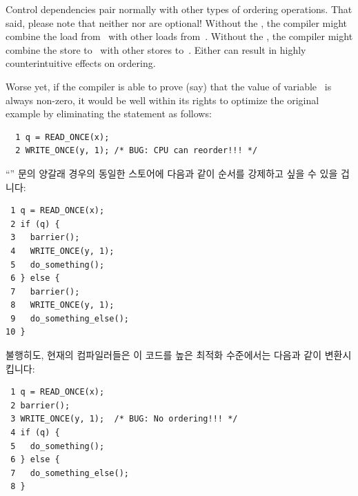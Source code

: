 Control dependencies pair normally with other types of ordering operations.
That said, please note that neither  nor 
are optional!
Without the , the compiler might combine the load
from~ with other loads from~.
Without the , the compiler might combine the store
to~ with other stores to~.
Either can result in highly counterintuitive effects on ordering.

Worse yet, if the compiler is able to prove (say) that the value of
variable~ is always non-zero, it would be well within its rights
to optimize the original example by eliminating the  statement
as follows:
\fi

\vspace{5pt}
\begin{minipage}[t]{\columnwidth}
\scriptsize
\begin{verbatim}
  1 q = READ_ONCE(x);
  2 WRITE_ONCE(y, 1); /* BUG: CPU can reorder!!! */
\end{verbatim}
\end{minipage}
\vspace{5pt}

``'' 문의 양갈래 경우의 동일한 스토어에 다음과 같이 순서를 강제하고 싶을
수 있을 겁니다:

\vspace{5pt}
\begin{minipage}[t]{\columnwidth}
\scriptsize
\begin{verbatim}
 1 q = READ_ONCE(x);
 2 if (q) {
 3   barrier();
 4   WRITE_ONCE(y, 1);
 5   do_something();
 6 } else {
 7   barrier();
 8   WRITE_ONCE(y, 1);
 9   do_something_else();
10 }
\end{verbatim}
\end{minipage}
\vspace{5pt}

불행히도, 현재의 컴파일러들은 이 코드를 높은 최적화 수준에서는 다음과 같이
변환시킵니다:

\vspace{5pt}
\begin{minipage}[t]{\columnwidth}
\scriptsize
\begin{verbatim}
 1 q = READ_ONCE(x);
 2 barrier();
 3 WRITE_ONCE(y, 1);  /* BUG: No ordering!!! */
 4 if (q) {
 5   do_something();
 6 } else {
 7   do_something_else();
 8 }
\end{verbatim}
\end{minipage}
\vspace{5pt}

